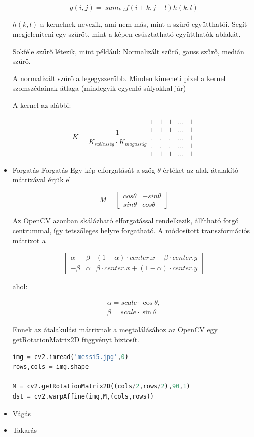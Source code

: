 \begin{itemize}
\[g (i, j) = \ sum_ {k, l} f (i + k, j + l) h (k, l)\]

$h(k, l)$ a kernelnek nevezik, ami nem más, mint a szűrő együtthatói. Segít megjeleníteni egy szűrőt, mint a képen csúsztatható együtthatók ablakát.

Sokféle szűrő létezik, mint például: Normalizált szűrő, gauss szűrő, medián szűrő.

A normalizált szűrő a legegyszerűbb. Minden kimeneti pixel a kernel szomszédainak átlaga (mindegyik egyenlő súlyokkal jár)

A kernel az alábbi:

\[K = \dfrac{1}{K_{szélesség} \cdot K_{magasság}}
\begin{matrix}
    1 & 1 & 1 & ... & 1 \\
    1 & 1 & 1 & ... & 1 \\
    . &. &. & ... & 1 \\
    . &. &. & ... & 1 \\
    1 & 1 & 1 & ... & 1   
\end{matrix}
\]
\item Forgatás
Forgatás
Egy kép elforgatását a szög $\theta$ értéket az alak átalakító mátrixával érjük el

$$M = \begin{bmatrix} cos\theta & -sin\theta \\ sin\theta & cos\theta   \end{bmatrix}$$

Az OpenCV azonban skálázható elforgatással rendelkezik, állítható forgó centrummal, így tetszőleges helyre forgatható. A módosított transzformációs mátrixot a

$$\begin{bmatrix}
\alpha &  \beta & (1- \alpha )  \cdot center.x -  \beta \cdot center.y \\ - \beta &  \alpha &  \beta \cdot center.x + (1- \alpha )  \cdot center.y
\end{bmatrix}$$

ahol:

$$\begin{array}{l}
\alpha =  scale \cdot \cos \theta , \\ \beta =  scale \cdot \sin \theta
\end{array}$$

Ennek az átalakulási mátrixnak a megtalálásához az OpenCV egy getRotationMatrix2D függvényt biztosít.

\begin{lstlisting}[language=Python]
img = cv2.imread('messi5.jpg',0)
rows,cols = img.shape

M = cv2.getRotationMatrix2D((cols/2,rows/2),90,1)
dst = cv2.warpAffine(img,M,(cols,rows))
\end{lstlisting}

\item Vágás
\item Takarás
\end{itemize}

